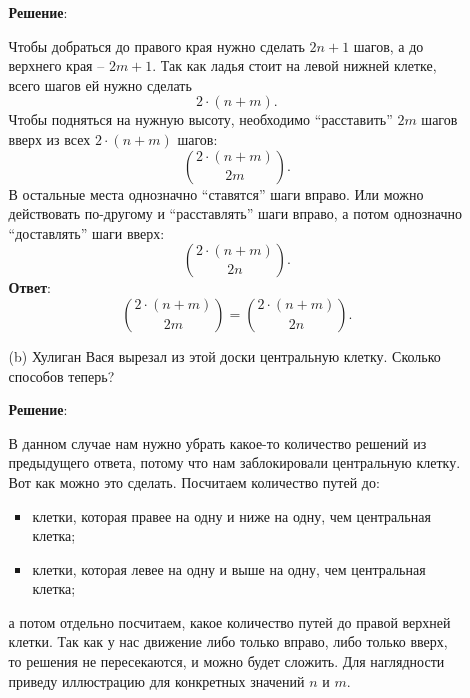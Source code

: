 \documentclass{article}
\begin{document}
\begin{enumerate}
\begin{itemize}
      \textbf{Решение}:

      Чтобы добраться до правого края нужно сделать $2n + 1$ шагов, а до верхнего края -- $2m + 1$. Так как ладья стоит на левой нижней клетке, всего шагов ей нужно сделать
      \begin{equation}
        2\cdot(n + m).
      \end{equation}
      Чтобы подняться на нужную высоту, необходимо ``расставить'' $2m$ шагов вверх из всех $2\cdot(n + m)$ шагов:
      \begin{equation}
        \binom{2\cdot(n + m)}{2m}.
      \end{equation}
      В остальные места однозначно ``ставятся'' шаги вправо. Или можно действовать по-другому и ``расставлять'' шаги вправо, а потом однозначно ``доставлять'' шаги вверх:
      \begin{equation}
        \binom{2\cdot(n + m)}{2n}.
      \end{equation}
      \textbf{Ответ}:
      $$\binom{2\cdot(n + m)}{2m} = \binom{2\cdot(n + m)}{2n}.$$

      \item[(b)] Хулиган Вася вырезал из этой доски центральную клетку. Сколько способов теперь?
      
      \textbf{Решение}:

      В данном случае нам нужно убрать какое-то количество решений из предыдущего ответа, потому что нам заблокировали центральную клетку. Вот как можно это сделать. Посчитаем количество путей до:
      \begin{itemize}
        \item клетки, которая правее на одну и ниже на одну, чем центральная клетка;
        \item клетки, которая левее на одну и выше на одну, чем центральная клетка;
      \end{itemize}
      а потом отдельно посчитаем, какое количество путей до правой верхней клетки. Так как у нас движение либо только вправо, либо только вверх, то решения не пересекаются, и можно будет сложить. Для наглядности приведу иллюстрацию для конкретных значений $n$ и $m$.
      \begin{center}


\end{center}
\end{itemize}
\end{enumerate}
\end{document}

